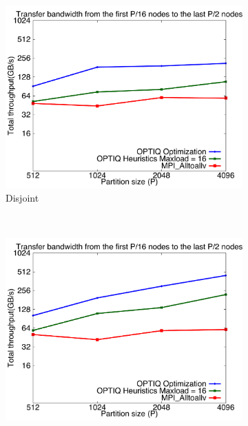 \begin{figure}[!htbp]
        \centering
        \begin{subfigure}[b]{0.32\textwidth}
                \includegraphics[width=\textwidth]{figures/constantr_3.pdf}
                \caption{Disjoint}
                \label{fig:constantr_3}
        \end{subfigure}%
        ~ %
        \begin{subfigure}[b]{0.32\textwidth}
                \includegraphics[width=\textwidth]{figures/constantr_27}

\end{subfigure}
\end{figure}
